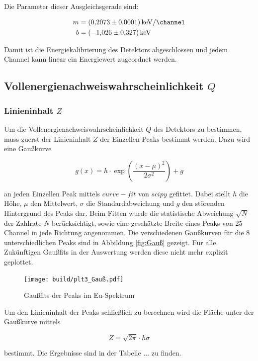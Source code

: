 Die Parameter dieser Ausgleichsgerade sind:

\begin{align}
	m&=\qty[per-mode=fraction]{0.2073(0.0001)}{\kilo\eV\per\channel}\\
	b&=\qty{-1.026(0.327)}{\kilo\eV}
\end{align}

Damit ist die Energiekalibrierung des Detektors abgeschlossen und jedem Channel kann linear ein Energiewert zugeordnet werden. 

\subsection{Vollenergienachweiswahrscheinlichkeit $Q$}
\subsubsection{Linieninhalt $Z$}
Um die Vollenergienachweiswahrscheinlichkeit $Q$ des Detektors zu bestimmen, muss zuerst der Linieninhalt $Z$ der Einzellen Peaks bestimmt werden. 
Dazu wird eine Gaußkurve 

\begin{equation}
	g(x)=h\cdot \exp(\frac{(x-\mu )^2}{2\sigma^2})+g
\end{equation}

an jeden Einzellen Peak mittels $curve-fit$ von $scipy$ \cite{scipy} gefittet. 
Dabei stellt $h$ die Höhe, $\mu$ den Mittelwert, $\sigma$ die Standardabweichung und $g$ den störenden Hintergrund des Peaks dar. 
Beim Fitten wurde die statistische Abweichung $\sqrt{N}$ der Zahlrate $N$ berücksichtigt, 
sowie eine geschätzte Breite eines Peaks von $25$ Channel in jede Richtung angenommen. 
Die verschiedenen Gaußkurven für die 8 unterschiedlichen Peaks sind in Abbildung \eqref{fig:Gauß} gezeigt. 
Für alle Zukünftigen Gaußfits in der Auswertung werden diese nicht mehr explizit geplottet. 

\begin{figure}
    \centering
    \texttt{[image: build/plt3\_Gauß.pdf]}
	\caption{Gaußfits der Peaks im Eu-Spektrum}
	\label{fig:Gauß}
\end{figure}

Um den Linieninhalt der Peaks schließlich zu berechnen wird die Fläche unter der Gaußkurve mittels 

\begin{equation}
	Z=\sqrt{2\pi}\cdot h\sigma
\end{equation}

bestimmt.
Die Ergebnisse sind in der Tabelle ... zu finden. 

